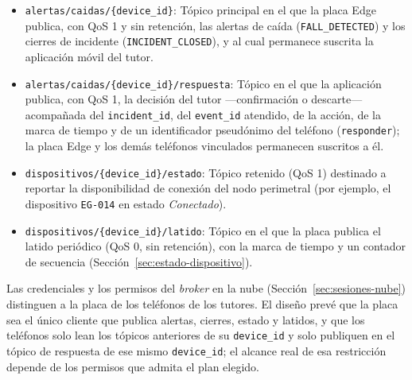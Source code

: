 \documentclass[12pt,a4paper,oneside]{book}
\theoremstyle{plain}
\theoremstyle{definition}
\theoremstyle{remark}
\begin{document}
\begin{itemize}
    \item \texttt{alertas/caidas/\{device\_id\}}: Tópico principal en el que la placa Edge publica, con QoS 1 y sin retención, las alertas de caída (\texttt{FALL\_DETECTED}) y los cierres de incidente (\texttt{INCIDENT\_CLOSED}), y al cual permanece suscrita la aplicación móvil del tutor.
    \item \texttt{alertas/caidas/\{device\_id\}/respuesta}: Tópico en el que la aplicación publica, con QoS 1, la decisión del tutor —confirmación o descarte— acompañada del \texttt{incident\_id}, del \texttt{event\_id} atendido, de la acción, de la marca de tiempo y de un identificador pseudónimo del teléfono (\texttt{responder}); la placa Edge y los demás teléfonos vinculados permanecen suscritos a él.
    \item \texttt{dispositivos/\{device\_id\}/estado}: Tópico retenido (QoS 1) destinado a reportar la disponibilidad de conexión del nodo perimetral (por ejemplo, el dispositivo \texttt{EG-014} en estado \textit{Conectado}).
    \item \texttt{dispositivos/\{device\_id\}/latido}: Tópico en el que la placa publica el latido periódico (QoS 0, sin retención), con la marca de tiempo y un contador de secuencia (Sección~\ref{sec:estado-dispositivo}).
\end{itemize}

Las credenciales y los permisos del \textit{broker} en la nube (Sección~\ref{sec:sesiones-nube}) distinguen a la placa de los teléfonos de los tutores. El diseño prevé que la placa sea el único cliente que publica alertas, cierres, estado y latidos, y que los teléfonos solo lean los tópicos anteriores de su \texttt{device\_id} y solo publiquen en el tópico de respuesta de ese mismo \texttt{device\_id}; el alcance real de esa restricción depende de los permisos que admita el plan elegido.
\end{document}
